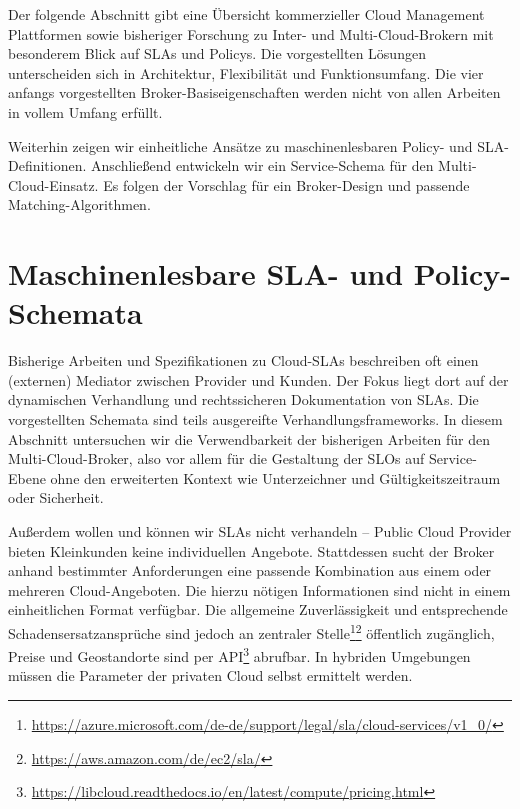 \noindent
Der folgende Abschnitt gibt eine Übersicht kommerzieller Cloud Management Plattformen sowie bisheriger Forschung zu Inter- und Multi-Cloud-Brokern mit besonderem Blick auf SLAs und Policys. Die vorgestellten Lösungen unterscheiden sich in Architektur, Flexibilität und Funktionsumfang. Die vier anfangs vorgestellten Broker-Basiseigenschaften werden nicht von allen Arbeiten in vollem Umfang erfüllt.

Weiterhin zeigen wir einheitliche Ansätze zu maschinenlesbaren Policy- und SLA-Definitionen. Anschließend entwickeln wir ein Service-Schema für den Multi-Cloud-Einsatz. Es folgen der Vorschlag für ein Broker-Design und passende Matching-Algorithmen.


\section{Maschinenlesbare SLA- und Policy-Schemata}%

Bisherige Arbeiten und Spezifikationen zu Cloud-SLAs beschreiben oft einen (externen) Mediator zwischen Provider und Kunden. Der Fokus liegt dort auf der dynamischen Verhandlung und rechtssicheren Dokumentation von SLAs. Die vorgestellten Schemata sind teils ausgereifte Verhandlungsframeworks. In diesem Abschnitt untersuchen wir die Verwendbarkeit der bisherigen Arbeiten für den Multi-Cloud-Broker, also vor allem für die Gestaltung der SLOs auf Service-Ebene ohne den erweiterten Kontext wie Unterzeichner und Gültigkeitszeitraum oder Sicherheit.



Außerdem wollen und können wir SLAs nicht verhandeln -- Public Cloud Provider bieten Kleinkunden keine individuellen Angebote. Stattdessen sucht der Broker anhand bestimmter Anforderungen eine passende Kombination aus einem oder mehreren Cloud-Angeboten. Die hierzu nötigen Informationen sind nicht in einem einheitlichen Format verfügbar. Die allgemeine Zuverlässigkeit und entsprechende Schadensersatzansprüche sind jedoch an zentraler Stelle\footnote{\url{https://azure.microsoft.com/de-de/support/legal/sla/cloud-services/v1_0/}}\footnote{\url{https://aws.amazon.com/de/ec2/sla/}} öffentlich zugänglich, Preise und Geostandorte sind per API\footnote{\url{https://libcloud.readthedocs.io/en/latest/compute/pricing.html}} abrufbar. In hybriden Umgebungen müssen die Parameter der privaten Cloud selbst ermittelt werden. 

